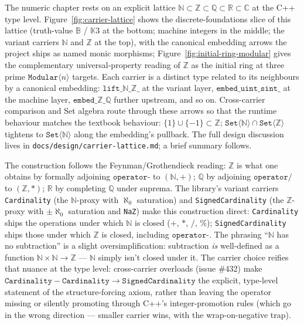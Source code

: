 \documentclass[11pt, a4paper]{report}
\begin{document}
The numeric chapter rests on an explicit lattice $\mathbb{N} \subset \mathbb{Z} \subset \mathbb{Q} \subset \mathbb{R} \subset \mathbb{C}$ at the C++ type level. Figure~\ref{fig:carrier-lattice} shows the discrete-foundations slice of this lattice (truth-value $\mathbb{B}$ / $\mathbb{K}3$ at the bottom; machine integers in the middle; the variant carriers $\mathbb{N}$ and $\mathbb{Z}$ at the top), with the canonical embedding arrows the project ships as named monic morphisms; Figure~\ref{fig:initial-ring-modular} gives the complementary universal-property reading of $\mathbb{Z}$ as the initial ring at three prime $\texttt{Modular}\langle n\rangle$ targets. Each carrier is a distinct type related to its neighbours by a canonical embedding: $\texttt{lift\_}\mathbb{N}\texttt{\_}\mathbb{Z}\texttt{\_}$ at the variant layer, $\texttt{embed\_uint\_sint\_}$ at the machine layer, $\texttt{embed\_}\mathbb{Z}\texttt{\_}\mathbb{Q}$ further upstream, and so on. Cross-carrier comparison and Set algebra route through these arrows so that the runtime behaviour matches the textbook behaviour: $\{1\} \cup \{-1\} \subset \mathbb{Z}$; $\texttt{Set}\langle\mathbb{N}\rangle \cap \texttt{Set}\langle\mathbb{Z}\rangle$ tightens to $\texttt{Set}\langle\mathbb{N}\rangle$ along the embedding's pullback. The full design discussion lives in \texttt{docs/design/carrier-lattice.md}; a brief summary follows.

The construction follows the Feynman/Grothendieck reading: $\mathbb{Z}$ is what one obtains by formally adjoining $\texttt{operator-}$ to $(\mathbb{N}, +)$; $\mathbb{Q}$ by adjoining $\texttt{operator/}$ to $(\mathbb{Z}, *)$; $\mathbb{R}$ by completing $\mathbb{Q}$ under suprema. The library's variant carriers \texttt{Cardinality} (the $\mathbb{N}$-proxy with $\aleph_0$ saturation) and \texttt{SignedCardinality} (the $\mathbb{Z}$-proxy with $\pm\aleph_0$ saturation and \texttt{NaZ}) make this construction direct: \texttt{Cardinality} ships the operations under which $\mathbb{N}$ is closed ($+$, $*$, $/$, $\%$); \texttt{SignedCardinality} ships those under which $\mathbb{Z}$ is closed, including $\texttt{operator-}$. The phrasing ``$\mathbb{N}$ has no subtraction'' is a slight oversimplification: subtraction \emph{is} well-defined as a function $\mathbb{N} \times \mathbb{N} \to \mathbb{Z}$ --- $\mathbb{N}$ simply isn't closed under it. The carrier choice reifies that nuance at the type level: cross-carrier overloads (issue \#432) make $\texttt{Cardinality} - \texttt{Cardinality} \to \texttt{SignedCardinality}$ the explicit, type-level statement of the structure-forcing axiom, rather than leaving the operator missing or silently promoting through C++'s integer-promotion rules (which go in the wrong direction --- smaller carrier wins, with the wrap-on-negative trap).
\end{document}
